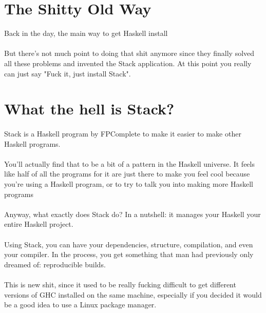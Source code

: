 \section{The Shitty Old Way}
Back in the day, the main way to get Haskell install

\paragraph{}
But there's not much point to doing that shit anymore since they finally solved all these problems and invented the Stack application.  At this point you really can just say "Fuck it, just install Stack". 

\section{What the hell is Stack?}

\paragraph{}
Stack is a Haskell program by FPComplete to make it easier to make other Haskell programs.  

\paragraph{}
You'll actually find that to be a bit of a pattern in the Haskell universe.  It feels like half of all the programs for it are just there to make you feel cool because you're using a Haskell program, or to try to talk you into making more Haskell programs

\paragraph{}
Anyway, what exactly does Stack do?  In a nutshell: it manages your Haskell your entire Haskell project.  

\paragraph{}
Using Stack, you can have your dependencies, structure, compilation, and even your compiler.  In the process, you get something that man had previously only dreamed of: reproducible builds. 

\paragraph{}
This is new shit, since it used to be really fucking difficult to get different versions of GHC installed on the same machine, especially if you decided it would be a good idea to use a Linux package manager. 

